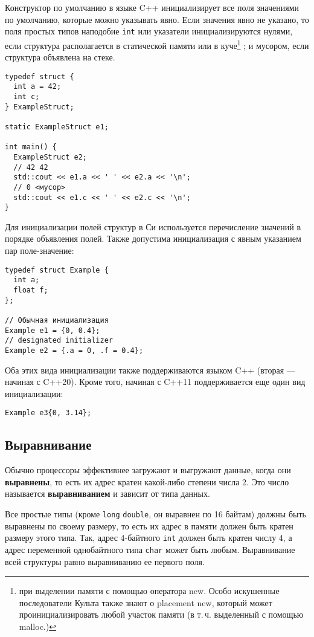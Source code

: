 Конструктор по умолчанию в языке C++ инициализирует все поля значениями по
умолчанию, которые можно указывать явно. Если значения явно не указано, то
поля простых типов наподобие \verb|int| или указатели инициализируются нулями,
если структура располагается в статической памяти или в куче\footnote{при
выделении памяти с помощью оператора new. Особо искушенные последователи Культа
также знают о placement new, который может проинициализировать любой участок памяти (в
т.\,ч. выделенный с помощью malloc.)}
; и мусором, если
структура объявлена на стеке.
\begin{verbatim}
typedef struct {
  int a = 42;
  int c;
} ExampleStruct;

static ExampleStruct e1;

int main() {
  ExampleStruct e2;
  // 42 42
  std::cout << e1.a << ' ' << e2.a << '\n';
  // 0 <мусор>
  std::cout << e1.c << ' ' << e2.c << '\n';
}
\end{verbatim}

Для инициализации полей структур в Си используется перечисление значений
в порядке объявления полей. Также допустима инициализация с явным указанием
пар поле-значение:
\begin{verbatim}
typedef struct Example {
  int a;
  float f;
};

// Обычная инициализация
Example e1 = {0, 0.4};
// designated initializer
Example e2 = {.a = 0, .f = 0.4};
\end{verbatim}

Оба этих вида инициализации также поддерживаются языком C++ (вторая --- начиная с C++20).
Кроме того, начиная с C++11 поддерживается еще один вид инициализации:
\begin{verbatim}
Example e3{0, 3.14};
\end{verbatim}

\subsection*{Выравнивание}

Обычно процессоры эффективнее загружают и выгружают данные, когда они \textbf{выравнены},
то есть их адрес кратен какой-либо степени числа 2. Это число называется \textbf{выравниванием}
и зависит от типа данных.

Все простые типы (кроме \verb|long| \verb|double|,
он выравнен по 16 байтам) должны быть выравнены по своему размеру,
то есть их адрес в памяти должен быть кратен размеру этого типа.
Так, адрес 4-байтного \verb|int| должен быть кратен числу 4, а адрес переменной
однобайтного типа \verb|char| может быть любым.
Выравнивание всей структуры равно выравниванию ее первого поля.

